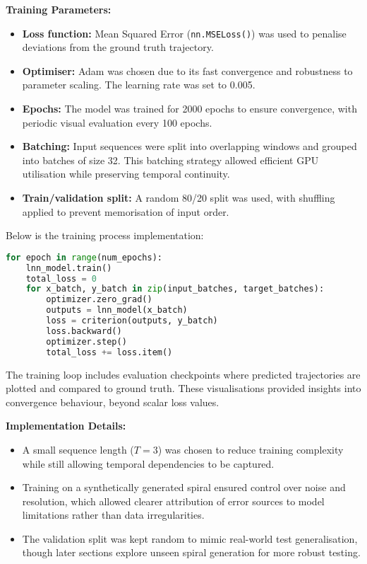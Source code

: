\vspace{0.5em}
\noindent \textbf{Training Parameters:}
\begin{itemize}
    \item \textbf{Loss function:} Mean Squared Error (\texttt{nn.MSELoss()}) was used to penalise deviations from the ground truth trajectory.
    \item \textbf{Optimiser:} Adam was chosen due to its fast convergence and robustness to parameter scaling. The learning rate was set to 0.005.
    \item \textbf{Epochs:} The model was trained for 2000 epochs to ensure convergence, with periodic visual evaluation every 100 epochs.
    \item \textbf{Batching:} Input sequences were split into overlapping windows and grouped into batches of size 32. This batching strategy allowed efficient GPU utilisation while preserving temporal continuity.
    \item \textbf{Train/validation split:} A random 80/20 split was used, with shuffling applied to prevent memorisation of input order.
\end{itemize}

\vspace{1em}
\noindent Below is the training process implementation:
\begin{lstlisting}[language=Python, caption={Simplified training loop for the LNN}]
for epoch in range(num_epochs):
    lnn_model.train()
    total_loss = 0
    for x_batch, y_batch in zip(input_batches, target_batches):
        optimizer.zero_grad()
        outputs = lnn_model(x_batch)
        loss = criterion(outputs, y_batch)
        loss.backward()
        optimizer.step()
        total_loss += loss.item()
\end{lstlisting}

\vspace{0.5em}
\noindent The training loop includes evaluation checkpoints where predicted trajectories are plotted and compared to ground truth. These visualisations provided insights into convergence behaviour, beyond scalar loss values.

\vspace{1em}
\noindent \textbf{Implementation Details:}
\begin{itemize}
    \item A small sequence length ($T = 3$) was chosen to reduce training complexity while still allowing temporal dependencies to be captured.
    \item Training on a synthetically generated spiral ensured control over noise and resolution, which allowed clearer attribution of error sources to model limitations rather than data irregularities.
    \item The validation split was kept random to mimic real-world test generalisation, though later sections explore unseen spiral generation for more robust testing.
\end{itemize}

